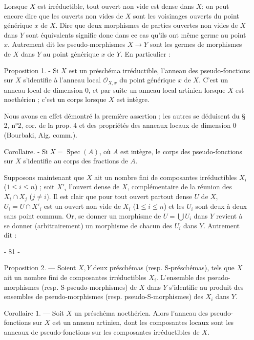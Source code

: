 Lorsque $X$ est irréductible, tout ouvert non vide est dense dans $X$; on peut encore dire que les ouverts non vides de $X$ sont les voisinages ouverts du point générique $x$ de $X$. Dire que deux morphismes de parties ouvertes non vides de $X$ dans $Y$ sont équivalents signifie donc dans ce cas qu'ils ont même germe au point $x$. Autrement dit les pseudo-morphismes $X \to Y$ sont les germes de morphismes de $X$ dans $Y$ au point générique $x$ de $Y$. En particulier :

Proposition 1. - Si $X$ est un préschéma irréductible, l'anneau des pseudo-fonctions sur $X$ s'identifie à l'anneau local $\mathcal{O}_{X,x}$ du point générique $x$ de $X$. C'est un anneau local de dimension 0, et par suite un anneau local artinien lorsque $X$ est noethérien ; c'est un corps lorsque $X$ est intègre.

Nous avons en effet démontré la première assertion ; les autres se déduisent du § 2, n°2, cor. de la prop. 4 et des propriétés des anneaux locaux de dimension 0 (Bourbaki, Alg. comm.).

Corollaire. - Si $X = \operatorname{Spec}(A)$, où $A$ est intègre, le corps des pseudo-fonctions sur $X$ s'identifie au corps des fractions de $A$.

Supposons maintenant que $X$ ait un nombre fini de composantes irréductibles $X_i$ ($1 \le i \le n$) ; soit $X'_i$ l'ouvert dense de $X$, complémentaire de la réunion des $X_i \cap X_j$ ($j \ne i$). Il est clair que pour tout ouvert partout dense $U$ de $X$, $U_i = U \cap X'_i$ est un ouvert non vide de $X_i$ ($1 \le i \le n$) et les $U_i$ sont deux à deux sans point commun. Or, se donner un morphisme de $U = \bigcup U_i$ dans $Y$ revient à se donner (arbitrairement) un morphisme de chacun des $U_i$ dans $Y$. Autrement dit :

\newpage


- 81 -

\noindent Proposition 2. — Soient $X, Y$ deux préschémas (resp. S-préschémas), tels que $X$ ait un nombre fini de composantes irréductibles $X_i$. L'ensemble des pseudo-morphismes (resp. S-pseudo-morphismes) de $X$ dans $Y$ s'identifie au produit des ensembles de pseudo-morphismes (resp. pseudo-S-morphismes) des $X_i$ dans $Y$.

\noindent Corollaire 1. — Soit $X$ un préschéma noethérien. Alors l'anneau des pseudo-fonctions sur $X$ est un anneau artinien, dont les composantes locaux sont les anneaux de pseudo-fonctions sur les composantes irréductibles de $X$.

